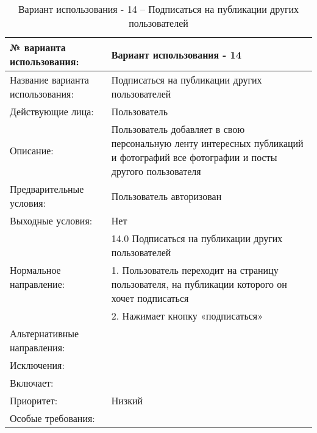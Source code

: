 \begin{table}[H]
  \caption{\onehalfspacing Вариант использования - 14 – Подписаться на публикации других пользователей}\label{use-case-14-table}
  \begin{tabular}{|p{6cm}|p{10cm}|}
  \hline № варианта использования: & Вариант использования - 14 \\
  \hline Название варианта использования: & Подписаться на публикации других пользователей \\
  \hline Действующие лица: & Пользователь \\
  \hline Описание: & Пользователь добавляет в свою персональную ленту интересных публикаций и фотографий все фотографии и посты другого пользователя \\
  \hline Предварительные условия: & Пользователь авторизован \\
  \hline Выходные условия: & Нет \\
  \hline \multirow{3}{*}{Нормальное направление:} & 14.0 Подписаться на публикации других пользователей \\
  \cline{2-2} & 1. Пользователь переходит на страницу пользователя, на публикации которого он хочет подписаться \\
  \cline{2-2} & 2. Нажимает кнопку «подписаться» \\
  \hline Альтернативные направления: &  \\
  \hline Исключения: &  \\
  \hline Включает: &  \\
  \hline Приоритет: & Низкий \\
  \hline Особые требования: &  \\
  \hline 
  \end{tabular}
\end{table}


